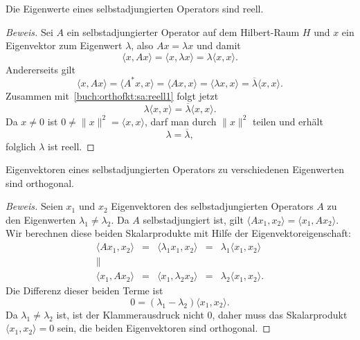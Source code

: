\begin{satz}
Die Eigenwerte eines selbstadjungierten Operators sind reell.
\end{satz}

\begin{proof}[Beweis]
Sei $A$ ein selbstadjungierter Operator auf dem Hilbert-Raum $H$ und
$x$ ein Eigenvektor zum Eigenwert $\lambda$, also $Ax=\lambda x$
und damit
\begin{equation}
\langle x,Ax\rangle
=
\langle x,\lambda x\rangle
=
\lambda \langle x,x\rangle.
\label{buch:orthofkt:sa:reell1}
\end{equation}
Andererseits gilt
\begin{equation}
\langle x,Ax\rangle
=
\langle A^*x,x\rangle
=
\langle Ax,x\rangle
=
\langle \lambda x,x\rangle
=
\overline{\lambda}
\langle x,x\rangle.
\label{buch:orthofkt:sa:reell2}
\end{equation}
Zusammen mit~\eqref{buch:orthofkt:sa:reell1} folgt jetzt
\[
\lambda \langle x,x\rangle = \overline{\lambda} \langle x,x\rangle.
\]
Da $x\ne 0$ ist $0\ne \|x\|^2 =\langle x,x\rangle$, darf man durch
$\|x\|^2$ teilen und erhält 
\[
\lambda = \overline{\lambda},
\]
folglich $\lambda$ ist reell.
\end{proof}

\begin{satz}
Eigenvektoren eines selbstadjungierten Operators zu verschiedenen Eigenwerten
sind orthogonal.
\end{satz}

\begin{proof}[Beweis]
Seien $x_1$ und $x_2$ Eigenvektoren des selbstadjungierten Operators $A$
zu den Eigenwerten $\lambda_1\ne \lambda_2$.
Da $A$ selbstadjungiert ist, gilt
$\langle Ax_1,x_2\rangle=\langle x_1,Ax_2\rangle$.
Wir berechnen diese beiden Skalarprodukte mit Hilfe der Eigenvektoreigenschaft:
\[
\renewcommand{\arraycolsep}{3pt}
\begin{array}{cclcl}
\langle Ax_1,x_2\rangle
&=&
\langle \lambda_1x_1,x_2\rangle
&=&
\lambda_1 \langle x_1,x_2\rangle
\\
          \|&&&&
\\
\langle x_1,Ax_2\rangle
&=&
\langle x_1,\lambda_2x_2\rangle
&=&
\lambda_2 \langle x_1,x_2\rangle.
\end{array}
\]
Die Differenz dieser beiden Terme ist
\[
0
=
(\lambda_1-\lambda_2)\langle x_1,x_2\rangle.
\]
Da $\lambda_1\ne \lambda_2$ ist, ist der Klammerausdruck nicht $0$, daher muss
das Skalarprodukt $\langle x_1,x_2\rangle=0$ sein, die beiden Eigenvektoren
sind orthogonal.
\end{proof}

